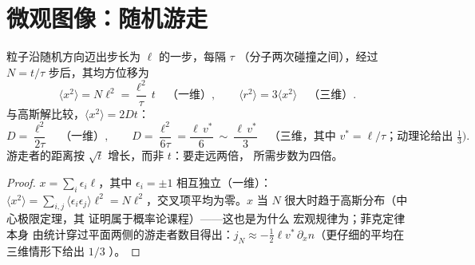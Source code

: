 \section{微观图像：随机游走}\label{sec:b2:particle-diffusion:microscopic}

\begin{proposition}[随机游走与扩散系数]\label{prop:b2:particle-diffusion:walk}
粒子沿随机方向迈出步长为 $\ell$ 的一步，每隔 $\tau$
（分子两次碰撞之间），经过 $N =
t/\tau$ 步后，其均方位移为
\[
\langle x^2\rangle = N\ell^2 = \frac{\ell^2}{\tau}\,t
\quad\text{（一维）}, \qquad
\langle r^2\rangle = 3\langle x^2\rangle \quad\text{（三维）}.
\]
与高斯解比较，$\langle x^2\rangle = 2Dt$：
\[
D = \frac{\ell^2}{2\tau} \quad\text{（一维）}, \qquad
D = \frac{\ell^2}{6\tau} = \frac{\ell\,v^*}{6}\ \sim\ \frac{\ell\,v^*}{3}
\quad\text{（三维，其中 } v^* = \ell/\tau\text{；动理论给出 } \tfrac13) .
\]
游走者的距离按 $\sqrt t$ 增长，而非 $t$：要走远两倍，
所需步数为四倍。
\end{proposition}

\begin{proof}
$x = \sum_i \epsilon_i\ell$，其中 $\epsilon_i = \pm1$ 相互独立（一维）：
$\langle x^2\rangle = \sum_{i,j}\langle\epsilon_i\epsilon_j\rangle\ell^2 =
N\ell^2$，交叉项平均为零。$x$
当 $N$ 很大时趋于高斯分布（中心极限定理，其
证明属于概率论课程）——这也是为什么
宏观规律为；菲克定律本身
由统计穿过平面两侧的游走者数目得出：$j_N \approx
-\tfrac12\ell v^*\,\partial_x n$（更仔细的平均在三维情形下给出 $1/3$
）。
\end{proof}

